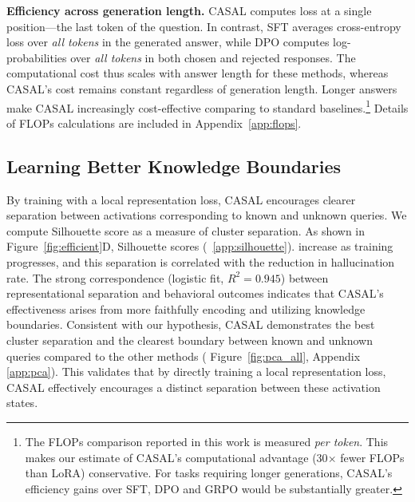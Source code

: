 \documentclass{article} %
\begin{document}
\textbf{Efficiency across generation length.} CASAL computes loss at a single position—the last token of the question. In contrast, SFT averages cross-entropy loss over \textit{all tokens} in the generated answer, while DPO computes log-probabilities over \textit{all tokens} in both chosen and rejected responses. The computational cost thus scales with answer length for these methods, whereas CASAL's cost remains constant regardless of generation length. Longer answers make CASAL increasingly cost-effective comparing to standard baselines.\footnote{The FLOPs comparison reported in this work is measured \textit{per token}. This makes our estimate of CASAL's computational advantage (30$\times$ fewer FLOPs than LoRA) conservative. For tasks requiring longer generations, CASAL's efficiency gains over SFT, DPO and GRPO would be substantially greater.} Details of FLOPs calculations are included in Appendix~\ref{app:flops}. 


\subsection{Learning Better Knowledge Boundaries}

By training with a local representation loss, CASAL encourages clearer separation between activations corresponding to known and unknown queries. We compute Silhouette score as a measure of cluster separation. As shown in Figure~\ref{fig:efficient}D, Silhouette scores (~\ref{app:silhouette}). increase as training progresses, and this separation is correlated with the reduction in hallucination rate. The strong correspondence (logistic fit, $R^2 = 0.945$) between representational separation and behavioral outcomes indicates that CASAL's effectiveness arises from more faithfully encoding and utilizing knowledge boundaries. Consistent with our hypothesis, CASAL demonstrates the best cluster separation and the clearest boundary between known and unknown queries compared to the other methods ( Figure~\ref{fig:pca_all}, Appendix \ref{app:pca}). This validates that by directly training a local representation loss, CASAL effectively encourages a distinct separation between these activation states.
\end{document}
